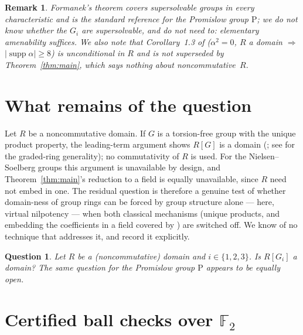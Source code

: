 \documentclass[10pt,a4paper]{amsart}
\newtheorem{question}[theorem]{Question}
\newtheorem{remark}[theorem]{Remark}
\renewcommand{\P}{\mathrm{P}}
\newcommand{\F}{\mathbb{F}}
\begin{document}
\begin{remark}
Formanek's theorem \cite{Formanek} covers supersolvable groups in every
characteristic and is the standard reference for the Promislow group $\P$;
we do not know whether the $G_i$ are supersolvable, and do not need to:
elementary amenability suffices. We also note that
Corollary~1.3 of \cite{NS} ($\alpha^2=0$, $R$ a domain $\Rightarrow$
$|\operatorname{supp}\alpha|\ge 8$) is unconditional in $R$ and is not
superseded by Theorem~\ref{thm:main}, which says nothing about
noncommutative~$R$.
\end{remark}

\section{What remains of the question}\label{sec:noncomm}

Let $R$ be a noncommutative domain. If $G$ is a torsion-free group with the
unique product property, the leading-term argument shows $R[G]$ is a domain
(\cite{Strojnowski}; see \cite[Theorem 3.4]{Oinert} for the graded-ring
generality); no commutativity of $R$ is used. For the Nielsen--Soelberg
groups this argument is unavailable by design, and Theorem~\ref{thm:main}'s
reduction to a field is equally unavailable, since $R$ need not embed in
one. The residual question is therefore a genuine test of whether
domain-ness of group rings can be forced by group structure alone --- here,
virtual nilpotency --- when both classical mechanisms (unique products, and
embedding the coefficients in a field covered by \cite{KLM}) are switched
off. We know of no technique that addresses it, and record it explicitly.

\begin{question}\label{q:noncomm}
Let $R$ be a (noncommutative) domain and $i\in\{1,2,3\}$. Is $R[G_i]$ a
domain? The same question for the Promislow group $\P$ appears to be
equally open.
\end{question}

\section{Certified ball checks over \texorpdfstring{$\F_2$}{F2}}
\label{sec:certs}
\end{document}
